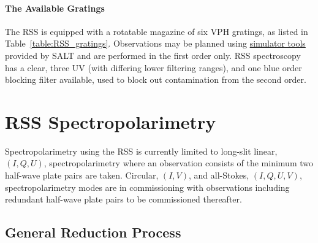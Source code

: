 \paragraph{The Available Gratings}
The \gls{RSS} is equipped with a rotatable magazine of six \gls{VPH} gratings, as listed in Table~\ref{table:RSS_gratings}. Observations may be planned using \href{https://astronomers.salt.ac.za/software/}{simulator tools} provided by \gls{SALT} and are performed in the first order only. \gls{RSS} spectroscopy has a clear, three \gls{UV} (with differing lower filtering ranges), and one blue order blocking filter available, used to block out contamination from the second order.




\section{RSS Spectropolarimetry} \label{sec:RSS_reductions} %

Spectropolarimetry using the \gls{RSS} is currently limited to long-slit linear, $(I, Q, U)$, spectro\-polarimetry where an observation consists of the minimum two half-wave plate pairs are taken. Circular, $(I, V)$, and all-Stokes, $(I, Q, U, V)$, spectropolarimetry modes are in commissioning with observations including redundant half-wave plate pairs to be commissioned thereafter.
\prgph


\subsection{General Reduction Process} %


